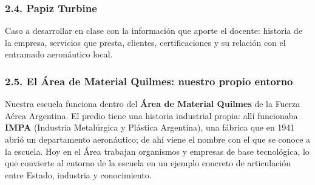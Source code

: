 \subsubsection*{2.4. Papiz Turbine}
Caso a desarrollar en clase con la información que aporte el docente: historia de la empresa,
servicios que presta, clientes, certificaciones y su relación con el entramado aeronáutico
local.

\subsubsection*{2.5. El Área de Material Quilmes: nuestro propio entorno}
Nuestra escuela funciona dentro del \textbf{Área de Material Quilmes} de la Fuerza Aérea
Argentina. El predio tiene una historia industrial propia: allí funcionaba
\textbf{IMPA} (Industria Metalúrgica y Plástica Argentina), una fábrica que en 1941 abrió un
departamento aeronáutico; de ahí viene el nombre con el que se conoce a la escuela. Hoy en el
Área trabajan organismos y empresas de base tecnológica, lo que convierte al entorno de la
escuela en un ejemplo concreto de articulación entre Estado, industria y conocimiento.


